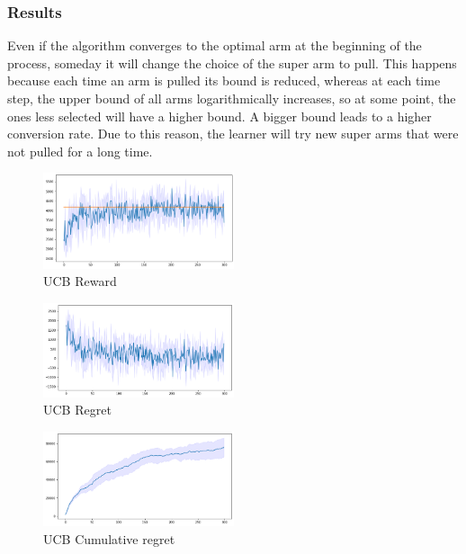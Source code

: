 \subsubsection{Results}
Even if the algorithm converges to the optimal arm at the beginning of the process, someday it will change the choice of the super arm to pull. This happens because each time an arm is pulled its bound is reduced, whereas at each time step, the upper bound of all arms logarithmically increases, so at some point, the ones less selected will have a higher bound. A bigger bound leads to a higher conversion rate. Due to this reason, the learner will try new super arms that were not pulled for a long time.
\begin{figure}[ht]
    \begin{center}
    \includegraphics[width=0.5\textwidth]{img/ucb3.png}
    \caption{UCB Reward}
    \label{fig:reward31}
    \end{center}
\end{figure}
\begin{multicols}{2}
    \begin{figure}[H]
        \begin{center}
        \includegraphics[width=0.5\textwidth]{img/ucb3_regret.png}
        \caption{UCB Regret}
        \label{fig:regret31}
        \end{center}
    \end{figure}
    \columnbreak
    \begin{figure}[H]
        \begin{center}
        \includegraphics[width=0.5\textwidth]{img/ucb3_cum_reg.png}
        \caption{UCB Cumulative regret}
        \label{fig:cum_reg31}
        \end{center}
    \end{figure}
\end{multicols}


